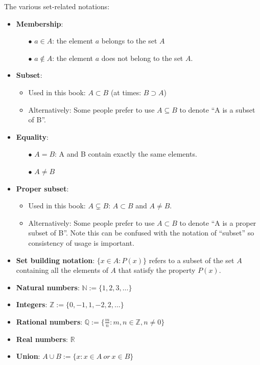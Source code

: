 \documentclass[12pt, letterpaper, oneside]{book}
\begin{document}
The various set-related notations:
\begin{itemize}
  \item \textbf{Membership}:
    \begin{itemize}
      \item[$\bullet$] $a \in A$: the element $a$ belongs to the set $A$
      \item[$\bullet$] $a \notin A$: the element $a$ does not belong to the set
        $A$.
    \end{itemize}
  \item \textbf{Subset}:
    \begin{itemize}
      \item Used in this book: $A \subset B$ (at times: $B \supset A$)
      \item Alternatively: Some people prefer to use $A \subseteq B$ to denote
        ``A is a subset of B''.
    \end{itemize}
  \item \textbf{Equality}:
    \begin{itemize}
      \item[$\bullet$] $A = B$: A and B contain exactly the same elements.
      \item[$\bullet$] $A \neq B$
    \end{itemize}
  \item \textbf{Proper subset}:
    \begin{itemize}
      \item Used in this book: $A \subsetneq B$: $A \subset B$ and $A \neq B$.
      \item Alternatively: Some people prefer to use $A \subset B$ to denote
        ``A is a proper subset of B''. Note this can be confused with the
        notation of ``subset'' so consistency of usage is important.
    \end{itemize}
  \item \textbf{Set building notation}: $\{x \in A: P(x)\}$ refers to a subset
    of the set $A$ containing all the elements of $A$ that satisfy the property
    $P(x)$.
  \item \textbf{Natural numbers}: $\mathbb{N} := \{1, 2, 3, \ldots \}$
  \item \textbf{Integers}: $\mathbb{Z} := \{0, -1, 1, -2, 2, \ldots \}$
  \item \textbf{Rational numbers}: $\mathbb{Q} := \{\frac{m}{n}: m,n \in
    \mathbb{Z}, n \neq 0 \}$
  \item \textbf{Real numbers}: $\mathbb{R}$
  \item \textbf{Union}: $A \cup B := \{x: x \in A \ or \ x \in B\}$

\end{itemize}
\end{document}
